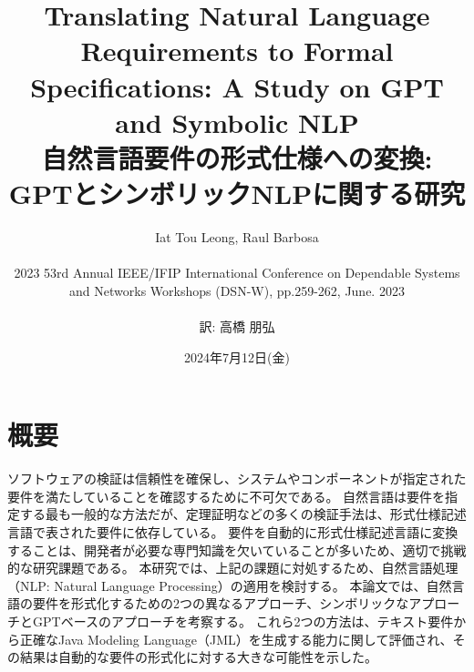 \documentclass[uplatex, twocolumn,10pt]{jsarticle} %
\begin{document}
\title{Translating Natural Language Requirements to Formal Specifications: A Study on GPT and Symbolic NLP \\
    自然言語要件の形式仕様への変換: GPTとシンボリックNLPに関する研究}
\author{Iat Tou Leong,  Raul Barbosa \\\\
    2023 53rd Annual IEEE/IFIP International Conference on Dependable Systems\\ and Networks Workshops (DSN-W), pp.259-262, June. 2023\\\\ 訳: 高橋 朋弘}
\date{2024年7月12日(金)}
\maketitle

\section*{概要} %
ソフトウェアの検証は信頼性を確保し、システムやコンポーネントが指定された要件を満たしていることを確認するために不可欠である。
自然言語は要件を指定する最も一般的な方法だが、定理証明などの多くの検証手法は、形式仕様記述言語で表された要件に依存している。
要件を自動的に形式仕様記述言語に変換することは、開発者が必要な専門知識を欠いていることが多いため、適切で挑戦的な研究課題である。
本研究では、上記の課題に対処するため、自然言語処理（NLP: Natural Language Processing）の適用を検討する。
本論文では、自然言語の要件を形式化するための2つの異なるアプローチ、シンボリックなアプローチとGPTベースのアプローチを考察する。
これら2つの方法は、テキスト要件から正確なJava Modeling Language（JML）を生成する能力に関して評価され、その結果は自動的な要件の形式化に対する大きな可能性を示した。

\end{document}
